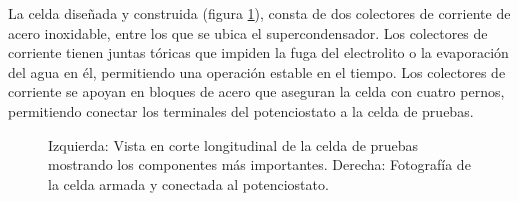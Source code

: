 La celda diseñada y construida (figura \ref{fig:celda_de_pruebas_SC}), consta de dos colectores de corriente de acero inoxidable, entre los que se ubica el supercondensador. Los colectores de corriente tienen juntas tóricas que impiden la fuga del electrolito o la evaporación del agua en él, permitiendo una operación estable en el tiempo. Los colectores de corriente se apoyan en bloques de acero que aseguran la celda con cuatro pernos, permitiendo conectar los terminales del potenciostato a la celda de pruebas.

\begin{figure}[h!]
	\centering
	\caption[Celda de pruebas de supercondensador.]{Izquierda: Vista en corte longitudinal de la celda de pruebas mostrando los componentes más importantes. Derecha: Fotografía de la celda armada y conectada al potenciostato.}
	\label{fig:celda_de_pruebas_SC}
\end{figure}

